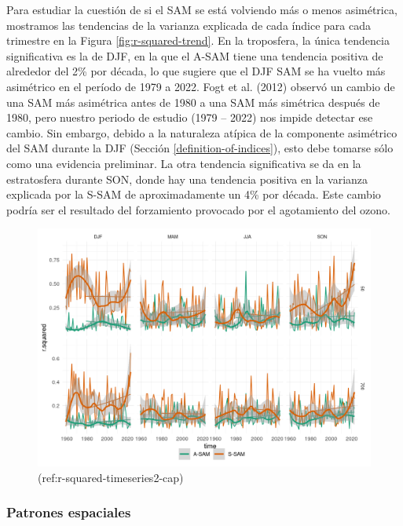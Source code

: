 \documentclass[12pt,oneside]{reedthesis}
\begin{document}
Para estudiar la cuestión de si el SAM se está volviendo más o menos asimétrica, mostramos las tendencias de la varianza explicada de cada índice para cada trimestre en la Figura \ref{fig:r-squared-trend}.
En la troposfera, la única tendencia significativa es la de DJF, en la que el A-SAM tiene una tendencia positiva de alrededor del 2\% por década, lo que sugiere que el DJF SAM se ha vuelto más asimétrico en el período de 1979 a 2022.
Fogt et al. (2012) observó un cambio de una SAM más asimétrica antes de 1980 a una SAM más simétrica después de 1980, pero nuestro periodo de estudio (1979 -- 2022) nos impide detectar ese cambio.
Sin embargo, debido a la naturaleza atípica de la componente asimétrico del SAM durante la DJF (Sección \ref{definition-of-indices}), esto debe tomarse sólo como una evidencia preliminar.
La otra tendencia significativa se da en la estratosfera durante SON, donde hay una tendencia positiva en la varianza explicada por la S-SAM de aproximadamente un 4\% por década.
Este cambio podría ser el resultado del forzamiento provocado por el agotamiento del ozono.

\begin{figure}
\includegraphics{figures/30-sam/r-squared-timeseries2-1} \caption{(ref:r-squared-timeseries2-cap)}\label{fig:r-squared-timeseries2}
\end{figure}

\hypertarget{spatial}{%
\subsubsection{Patrones espaciales}\label{spatial}}
\end{document}
